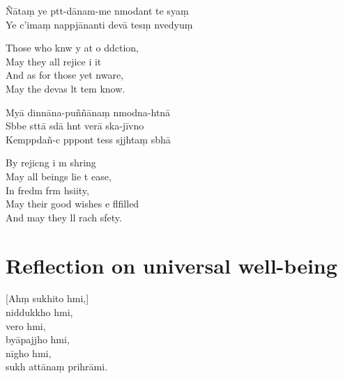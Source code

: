 Ñātaṃ ye ptt-dānam-me nmodant te syaṃ\\
Ye c'imaṃ nappjānanti devā tesṃ nvedyuṃ

\begin{english}
  Those who knw y at o ddction,\\
  May they all rejice i it\\
  And as for those yet nware,\\
  May the devas lt tem know.
\end{english}

Myā dinnāna-puññānaṃ nmodna-htnā\\
Sbbe sttā sdā hnt verā ska-jīvno\\
Kemppdañ-c pppont tess sjjhtaṃ sbhā

\begin{english}
  By rejicng i m shring\\
  May all beings lie t ease,\\
  In fredm frm hsiity,\\
  May their good wishes e flfilled\\
  And may they ll rach sfety.
\end{english}

\clearpage

\chapter[Universal well-being]{Reflection on universal well-being}                                     %

\begin{leader}
\end{leader}

[Ahṃ sukhito hmi,]\\
niddukkho hmi,\\
vero hmi,\\
byāpajjho hmi,\\
nīgho hmi,\\
sukh attānaṃ prihrāmi.

